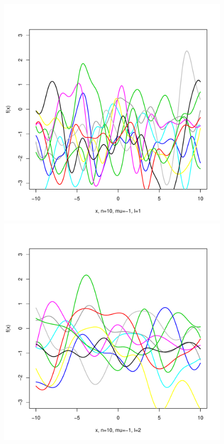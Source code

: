 \documentclass[12pt,letterpaper]{article}
\begin{document}
\begin{figure}
\begin{center}
\includegraphics[scale=0.2]{hw321/n10-m-1-l1.pdf}
\includegraphics[scale=0.2]{hw321/n10-m-1-l2.pdf}

\end{center}
\end{figure}
\end{document}

